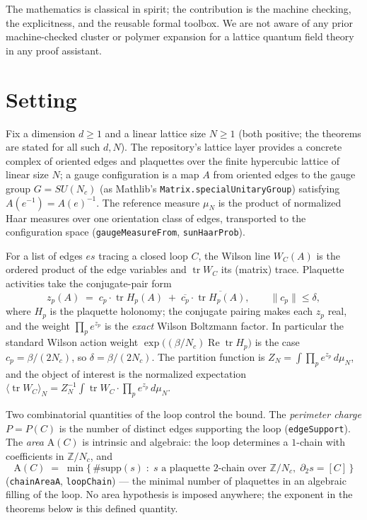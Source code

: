 \documentclass[11pt]{article}
\theoremstyle{remark}
\newcommand{\tr}{\operatorname{tr}}
\newcommand{\loopsupp}{P}
\newcommand{\Area}{\mathrm{A}}
\begin{document}
The mathematics is classical in spirit; the contribution is the machine
checking, the explicitness, and the reusable formal toolbox.  We are not
aware of any prior machine-checked cluster or polymer expansion for a
lattice quantum field theory in any proof assistant.

\section{Setting}\label{sec:setting}

Fix a dimension $d \ge 1$ and a linear lattice size $N \ge 1$ (both
positive; the theorems are stated for all such $d, N$).  The repository's
lattice layer provides a concrete complex of oriented edges and plaquettes
over the finite hypercubic lattice of linear size $N$; a gauge
configuration is a map $A$ from oriented edges to the gauge group
$G = SU(N_c)$ (as Mathlib's \texttt{Matrix.specialUnitaryGroup}) satisfying
$A(e^{-1}) = A(e)^{-1}$.  The reference measure $\mu_N$ is the product of
normalized Haar measures over one orientation class of edges, transported
to the configuration space (\texttt{gaugeMeasureFrom},
\texttt{sunHaarProb}).

For a list of edges $\mathit{es}$ tracing a closed loop $C$, the Wilson
line $W_C(A)$ is the ordered product of the edge variables and
$\tr W_C$ its (matrix) trace.  Plaquette activities take the
conjugate-pair form
\[
  z_p(A) \;=\; c_p \cdot \tr H_p(A) \;+\; \overline{c_p} \cdot
  \overline{\tr H_p(A)},
  \qquad \lVert c_p \rVert \le \delta ,
\]
where $H_p$ is the plaquette holonomy; the conjugate pairing makes each
$z_p$ real, and the weight $\prod_p e^{z_p}$ is the \emph{exact} Wilson
Boltzmann factor.  In particular the standard Wilson action weight
$\exp\bigl((\beta/N_c)\operatorname{Re}\tr H_p\bigr)$ is the case
$c_p = \beta/(2N_c)$, so $\delta = \beta/(2N_c)$.  The partition function
is $Z_N = \int \prod_p e^{z_p}\, d\mu_N$, and the object of interest is the
normalized expectation
$\langle \tr W_C \rangle_N = Z_N^{-1} \int \tr W_C \cdot \prod_p e^{z_p}\,
d\mu_N$.

Two combinatorial quantities of the loop control the bound.  The
\emph{perimeter charge} $\loopsupp = \loopsupp(C)$ is the number of
distinct edges supporting the loop (\texttt{edgeSupport}).  The
\emph{area} $\Area(C)$ is intrinsic and algebraic: the loop determines a
$1$-chain with coefficients in $\mathbb{Z}/N_c$, and
\[
  \Area(C) \;=\; \min \bigl\{\, \#\mathrm{supp}(s) \;:\;
    s \text{ a plaquette 2-chain over } \mathbb{Z}/N_c,\;
    \partial_2 s = [C] \,\bigr\}
\]
(\texttt{chainAreaA}, \texttt{loopChain}) --- the minimal number of
plaquettes in an algebraic filling of the loop.  No area hypothesis is
imposed anywhere; the exponent in the theorems below is this defined
quantity.
\end{document}
